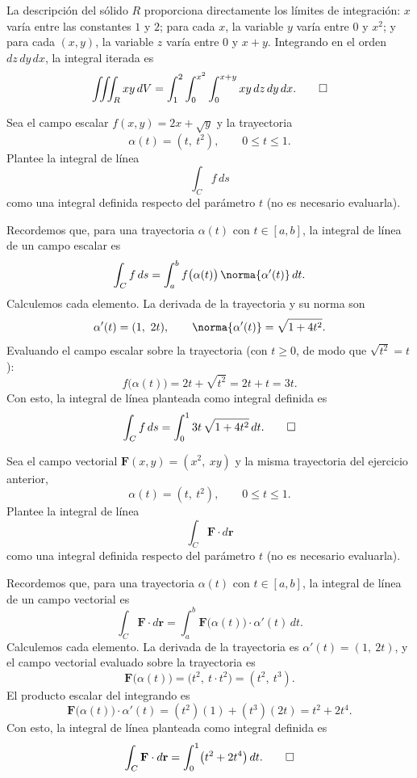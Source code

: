 \documentclass[11pt,respuestas,a4]{aleph-examen}
\begin{document}
\begin{preguntas}
\begin{respuesta}
La descripción del sólido $R$ proporciona directamente los límites de integración: $x$ varía entre las constantes $1$ y $2$; para cada $x$, la variable $y$ varía entre $0$ y $x^2$; y para cada $(x,y)$, la variable $z$ varía entre $0$ y $x+y$. Integrando en el orden $dz\,dy\,dx$, la integral iterada es
\[
    \iiint_R xy\,dV
    =
    \int_1^2 \int_0^{x^2} \int_0^{x+y} xy\,dz\,dy\,dx.\qedhere
\]
\end{respuesta}


\item
Sea el campo escalar $f(x,y) = 2x + \sqrt{y}$ y la trayectoria
\[
    \alpha(t) = (t,\ t^2),\qquad 0\le t\le 1.
\]
{Plantee} la integral de línea
\[
    \int_C f\,ds
\]
como una integral definida respecto del parámetro $t$ (no es necesario evaluarla).

\begin{respuesta}
Recordemos que, para una trayectoria $\alpha(t)$ con $t\in[a,b]$, la integral de línea de un campo escalar es
\[
    \int_C f\,ds = \int_a^b f\bigl(\alpha(t)\bigr)\,\norma{\alpha'(t)}\,dt.
\]
Calculemos cada elemento. La derivada de la trayectoria y su norma son
\[
    \alpha'(t) = (1,\ 2t),
    \qquad
    \norma{\alpha'(t)} = \sqrt{1 + 4t^2}.
\]
Evaluando el campo escalar sobre la trayectoria (con $t\ge 0$, de modo que $\sqrt{t^2}=t$):
\[
    f\bigl(\alpha(t)\bigr) = 2t + \sqrt{t^2} = 2t + t = 3t.
\]
Con esto, la integral de línea planteada como integral definida es
\[
    \int_C f\,ds = \int_0^1 3t\,\sqrt{1 + 4t^2}\,dt.\qedhere
\]
\end{respuesta}


\item
Sea el campo vectorial $\mathbf{F}(x,y) = (x^2,\ xy)$ y la misma trayectoria del ejercicio anterior,
\[
    \alpha(t) = (t,\ t^2),\qquad 0\le t\le 1.
\]
{Plantee} la integral de línea
\[
    \int_C \mathbf{F}\cdot d\mathbf{r}
\]
como una integral definida respecto del parámetro $t$ (no es necesario evaluarla).

\begin{respuesta}
Recordemos que, para una trayectoria $\alpha(t)$ con $t\in[a,b]$, la integral de línea de un campo vectorial es
\[
    \int_C \mathbf{F}\cdot d\mathbf{r} = \int_a^b \mathbf{F}\bigl(\alpha(t)\bigr)\cdot \alpha'(t)\,dt.
\]
Calculemos cada elemento. La derivada de la trayectoria es $\alpha'(t) = (1,\ 2t)$, y el campo vectorial evaluado sobre la trayectoria es
\[
    \mathbf{F}\bigl(\alpha(t)\bigr) = \bigl(t^2,\ t\cdot t^2\bigr) = (t^2,\ t^3).
\]
El producto escalar del integrando es
\[
    \mathbf{F}\bigl(\alpha(t)\bigr)\cdot \alpha'(t) = (t^2)(1) + (t^3)(2t) = t^2 + 2t^4.
\]
Con esto, la integral de línea planteada como integral definida es
\[
    \int_C \mathbf{F}\cdot d\mathbf{r} = \int_0^1 \bigl(t^2 + 2t^4\bigr)\,dt.\qedhere
\]
\end{respuesta}

\end{preguntas}
\end{document}

